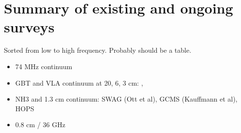 \section{Summary of existing and ongoing surveys}
Sorted from low to high frequency.  Probably should be a table.

\begin{itemize}
    \item 74 MHz continuum \citep{Yusef-Zadeh2013c}
    \item GBT and VLA continuum at 20, 6, 3 cm: \citet{Law2008a}, \citet{Law2008b}
    \item NH3 and 1.3 cm continuum: SWAG (Ott et al), GCMS (Kauffmann et al), HOPS \citep{Walsh2011a}
    \item 0.8 cm / 36 GHz \citep{Yusef-Zadeh2013a}
    
\end{itemize}